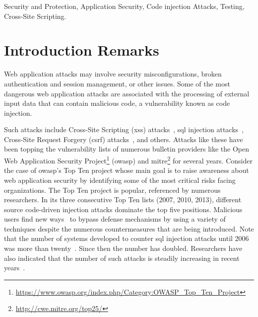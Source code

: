 \documentclass[conference]{IEEEtran}
\begin{document}
\begin{IEEEkeywords}
Security and Protection, Application Security, Code injection Attacks,
Testing, Cross-Site Scripting.
\end{IEEEkeywords}

\IEEEpeerreviewmaketitle

\section{Introduction Remarks}

Web application attacks may involve security misconfigurations, broken
authentication and session management, or other issues. Some of the
most dangerous web application attacks are associated with the
processing of external input data that can contain malicious code, a
vulnerability known as code injection.

Such attacks include Cross-Site Scripting ({\sc xss})
attacks~\cite{SG07}, {\sc sql} injection attacks~\cite{RL12b},
Cross-Site Request Forgery ({\sc csrf}) attacks~\cite{LZRL09}, and
others. Attacks like these have been topping the vulnerability lists
of numerous bulletin providers like the Open Web Application Security
Project\footnote{\url{https://www.owasp.org/index.php/Category:OWASP_Top_Ten_Project}}
({\sc owasp}) and {\sc
  mitre}\footnote{\url{http://cwe.mitre.org/top25/}} for several
years. Consider the case of {\sc owasp}'s Top Ten project whose main
goal is to raise awareness about web application security by
identifying some of the most critical risks facing organizations. The
Top Ten project is popular, referenced by numerous researchers. In its
three consecutive Top Ten lists (2007, 2010, 2013), different
source code-driven injection attacks dominate the top five
positions. Malicious users find new ways~\cite{HNSHS12,DKH14}
to bypass defense mechanisms
by using a variety of techniques despite the numerous countermeasures
that are being introduced. Note that the number of systems developed
to counter {\sc sql} injection attacks until 2006 was more than
twenty~\cite{HVO06}. Since then the number has doubled. Researchers
have also indicated that the number of such attacks is steadily
increasing in recent years~\cite{SSL12}.
\end{document}
